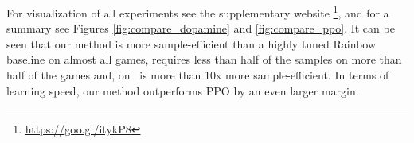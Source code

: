 For visualization of all experiments see the supplementary website
\footnote{\url{https://goo.gl/itykP8}},
and for a summary see Figures \ref{fig:compare_dopamine} and  \ref{fig:compare_ppo}.
It can be seen that our method is more sample-efficient than a highly tuned Rainbow baseline
on almost all games, requires less than half of the samples on more than half of the games
and, on \freeway\, is more than 10x more sample-efficient. In terms of learning speed, our method outperforms PPO by an even larger margin.




